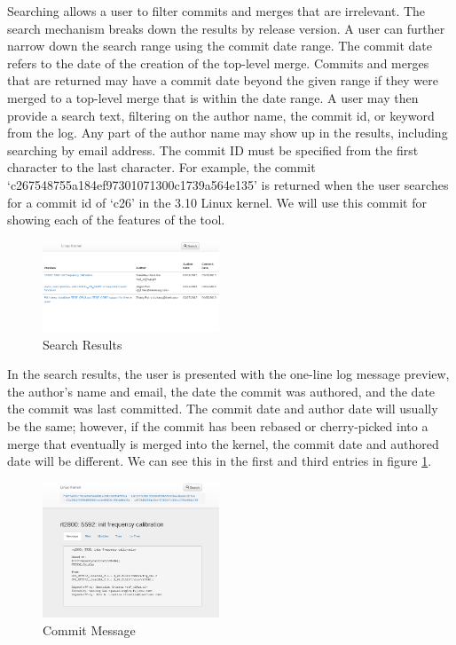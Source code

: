\documentclass[conference, draftclsnofoot]{IEEEtran}
\begin{document}
Searching allows a user to filter commits and merges that are irrelevant.  The
search mechanism breaks down the results by release version. A user can further
narrow down the search range using the commit date range. The commit date refers to
the date of the creation of the top-level merge. Commits and merges that are
returned may have a commit date beyond the given range if they were merged to a
top-level merge that is within the date range. A user may then provide a search
text, filtering on the author name, the commit id, or keyword from the log. Any part
of the author name may show up in the results, including searching by email address.
The commit ID must be specified from the first character to the last character. For
example, the commit `c267548755a184ef97301071300c1739a564e135' is returned when the
user searches for a commit id of `c26' in the 3.10 Linux kernel. We will use this
commit for showing each of the features of the tool.

\begin{figure}
        \centering
        \includegraphics[width=0.47\textwidth]{figures/search_results.png}
        \caption{Search Results}
        \label{fig:results}
\end{figure}

In the search results, the user is presented with the one-line log message preview,
the author's name and email, the date the commit was authored, and the date the
commit was last committed. The commit date and author date will usually be the same;
however, if the commit has been rebased or cherry-picked into a merge that
eventually is merged into the kernel, the commit date and authored date will be
different. We can see this in the first and third entries in figure
\ref{fig:results}.

\begin{figure}
        \centering
        \includegraphics[width=0.47\textwidth]{figures/message_view.png}
        \caption{Commit Message}
        \label{fig:message}
\end{figure}
\end{document}
